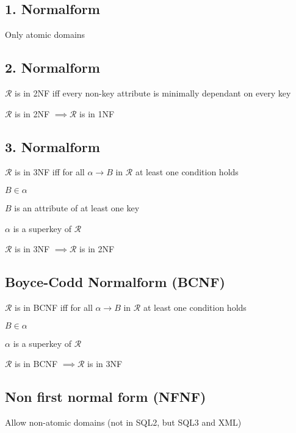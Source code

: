 \subsection{1. Normalform}
\enumstart
	\item Only atomic domains
\enumend

\subsection{2. Normalform}
\enumstart
	\item $\mathcal{R}$ is in 2NF iff every non-key attribute is minimally dependant on every key
	\item $\mathcal{R}$ is in 2NF $\implies \mathcal{R}$ is in 1NF 
\enumend

\subsection{3. Normalform}
\enumstart
	\item $\mathcal{R}$ is in 3NF iff for all $\alpha \rightarrow B$ in $\mathcal{R}$ at least one condition holds
	\enumstart
		\item $B \in \alpha$
		\item $B$ is an attribute of at least one key
		\item $\alpha$ is a superkey of $\mathcal{R}$
	\enumend
	\item $\mathcal{R}$ is in 3NF $\implies \mathcal{R}$ is in 2NF 
\enumend

\subsection{Boyce-Codd Normalform (BCNF)}
\enumstart
	\item $\mathcal{R}$ is in BCNF iff for all $\alpha \rightarrow B$ in $\mathcal{R}$ at least one condition holds
	\enumstart
		\item $B \in \alpha$
		\item $\alpha$ is a superkey of $\mathcal{R}$
	\enumend
	\item $\mathcal{R}$ is in BCNF $\implies \mathcal{R}$ is in 3NF 
\enumend

\subsection{Non first normal form (NFNF)}
\enumstart
	\item Allow non-atomic domains (not in SQL2, but SQL3 and XML)
\enumend

